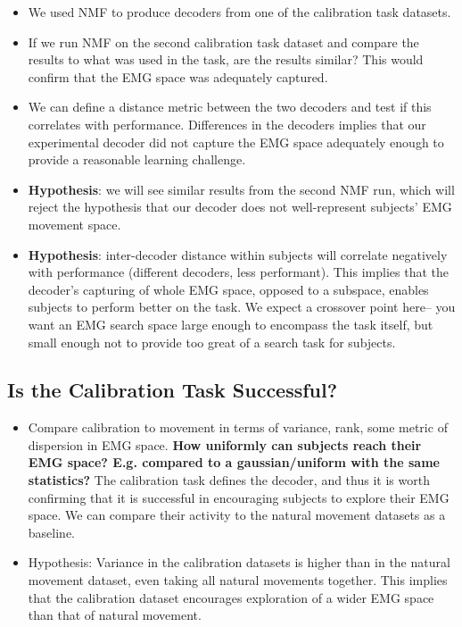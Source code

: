 \documentclass[../main.tex]{subfiles}
\begin{document}
\begin{itemize} 
  \item We used NMF to produce decoders from one of the calibration task datasets. 
  \item If we run NMF on the second calibration task dataset and compare the results to what was used in the task, are the results similar? This would confirm that the EMG space was adequately captured. 
  \item We can define a distance metric between the two decoders and test if this correlates with performance. Differences in the decoders implies that our experimental decoder did not capture the EMG space adequately enough to provide a reasonable learning challenge.
  \item \textbf{Hypothesis}: we will see similar results from the second NMF run, which will reject the hypothesis that our decoder does not well-represent subjects’ EMG movement space.
  \item \textbf{Hypothesis}: inter-decoder distance within subjects will correlate negatively with performance (different decoders, less performant). This implies that the decoder’s capturing of whole EMG space, opposed to a subspace, enables subjects to perform better on the task. We expect a crossover point here– you want an EMG search space large enough to encompass the task itself, but small enough not to provide too great of a search task for subjects.
\end{itemize}


\subsection{Is the Calibration Task Successful? \rbrack}

\begin{itemize}
  \item Compare calibration to movement in terms of variance, rank, some metric of dispersion in EMG space. \textbf{How uniformly can subjects reach their EMG space? E.g. compared to a gaussian/uniform with the same statistics?} The calibration task defines the decoder, and thus it is worth confirming that it is successful in encouraging subjects to explore their EMG space. We can compare their activity to the natural movement datasets as a baseline.
  \item Hypothesis: Variance in the calibration datasets is higher than in the natural movement dataset, even taking all natural movements together. This implies that the calibration dataset encourages exploration of a wider EMG space than that of natural movement.
\end{itemize}
\end{document}
